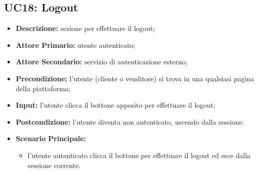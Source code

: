 \subsection{UC18: Logout}
\label{sec:UC18}
\begin{itemize}
    \item \textbf{Descrizione:} sezione per effettuare il logout;
    \item \textbf{Attore Primario:} utente autenticato;
    \item \textbf{Attore Secondario:} servizio di autenticazione esterno;
    \item \textbf{Precondizione:} l'utente (cliente o venditore) si trova in una qualsiasi pagina della piattaforma;
    \item \textbf{Input:} l'utente clicca il bottone apposito per effettuare il logout;
    \item \textbf{Postcondizione:} l'utente diventa non autenticato, uscendo dalla sessione.
    \item \textbf{Scenario Principale:}
          \begin{itemize}
              \item l'utente autenticato clicca il bottone per effettuare il logout ed esce dalla sessione corrente.
          \end{itemize}
\end{itemize}